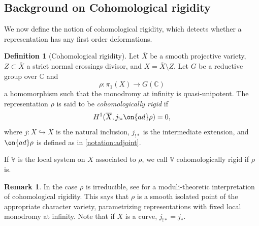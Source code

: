 \documentclass[12 pt]{amsart}
\theoremstyle{plain}
\theoremstyle{definition}
\newtheorem{definition}[subsubsection]{Definition}
\newtheorem{remark}[subsubsection]{Remark}
\theoremstyle{remark}
\numberwithin{equation}{section}
\begin{document}
\subsection{Background on Cohomological rigidity}
\label{subsection:background-rigidity}

We now define the notion of cohomological rigidity, which detects whether a
representation has any first order deformations.

\begin{definition}[Cohomological rigidity]\label{definition:rigidity}
    Let $\overline{X}$ be a smooth projective variety, $Z\subset \overline{X}$ a
    strict normal crossings divisor, and $X=\overline{X}\setminus Z$. Let $G$ be
    a reductive group over $\mathbb{C}$ and $$\rho: \pi_1(X)\to G(\mathbb{C})$$
    a homomorphism such that the monodromy at infinity is quasi-unipotent.   
     The representation $\rho$ is said to be \emph{cohomologically rigid} if
    $$H^1(\overline{X}, j_{!*}\on{ad}\rho)=0,$$ where $j: X\hookrightarrow
    \overline{X}$ is the natural inclusion, $j_{!*}$ is the intermediate
    extension, and $\on{ad}\rho$ is defined as in \autoref{notation:adjoint}.
    
    If $\mathbb{V}$ is the local system on $X$ associated to $\rho$, we call $\mathbb{V}$ cohomologically rigid if $\rho$ is.
\end{definition}
\begin{remark}
	\label{remark:}
	In the case $\rho$ is irreducible, see \cite[Proposition 4.7, Remark
    4.8]{klevdalP:g-rigid-local-systems-are-integral} for a moduli-theoretic
    interpretation of cohomological rigidity. 
    This says that $\rho$ is a smooth isolated point of the appropriate character variety, parametrizing representations with {fixed} local monodromy at infinity. Note that if $\overline{X}$ is a curve, $j_{!*}=j_*.$
\end{remark}
\end{document}
